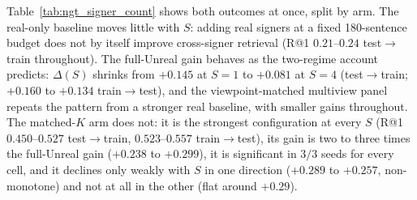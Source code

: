 Table~\ref{tab:ngt_signer_count} shows both outcomes at once, split by arm.
The real-only baseline moves little with $S$: adding real signers at a
fixed 180-sentence budget does not by itself improve cross-signer retrieval
(R@1 $0.21$--$0.24$ test$\to$train throughout). The full-Unreal gain
behaves as the two-regime account predicts: $\Delta(S)$ shrinks from
$+0.145$ at $S{=}1$ to $+0.081$ at $S{=}4$ (test$\to$train; $+0.160$ to
$+0.134$ train$\to$test), and the viewpoint-matched multiview panel repeats
the pattern from a stronger real baseline, with smaller gains throughout.
The matched-$K$ arm does not: it is the strongest configuration at every
$S$ (R@1 $0.450$--$0.527$ test$\to$train, $0.523$--$0.557$
train$\to$test), its gain is two to three times the full-Unreal gain
($+0.238$ to $+0.299$), it is significant in $3/3$ seeds for every cell,
and it declines only weakly with $S$ in one direction ($+0.289$ to
$+0.257$, non-monotone) and not at all in the other (flat around
$+0.29$).

